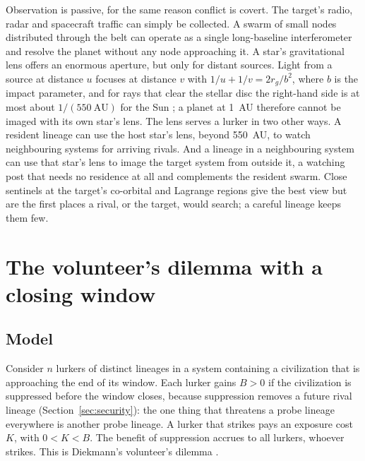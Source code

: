 \documentclass[preprint,12pt]{elsarticle}
\theoremstyle{definition}
\begin{document}
Observation is passive, for the same reason conflict is covert. The target's radio, radar and spacecraft traffic can simply be collected. A swarm of small nodes distributed through the belt can operate as a single long-baseline interferometer and resolve the planet without any node approaching it. A star's gravitational lens offers an enormous aperture, but only for distant sources. Light from a source at distance $u$ focuses at distance $v$ with $1/u + 1/v = 2 r_g/b^{2}$, where $b$ is the impact parameter, and for rays that clear the stellar disc the right-hand side is at most about $1/(550~\mathrm{AU})$ for the Sun \citep{Eshleman1979,TuryshevToth2017}; a planet at 1~AU therefore cannot be imaged with its own star's lens. The lens serves a lurker in two other ways. A resident lineage can use the host star's lens, beyond 550~AU, to watch neighbouring systems for arriving rivals. And a lineage in a neighbouring system can use that star's lens to image the target system from outside it, a watching post that needs no residence at all and complements the resident swarm. Close sentinels at the target's co-orbital and Lagrange regions give the best view but are the first places a rival, or the target, would search; a careful lineage keeps them few.

\section{The volunteer's dilemma with a closing window}
\label{sec:vd}

\subsection{Model}

Consider $n$ lurkers of distinct lineages in a system containing a civilization that is approaching the end of its window. Each lurker gains $B > 0$ if the civilization is suppressed before the window closes, because suppression removes a future rival lineage (Section~\ref{sec:security}): the one thing that threatens a probe lineage everywhere is another probe lineage. A lurker that strikes pays an exposure cost $K$, with $0 < K < B$. The benefit of suppression accrues to all lurkers, whoever strikes. This is Diekmann's volunteer's dilemma \citep{Diekmann1985}.
\end{document}
